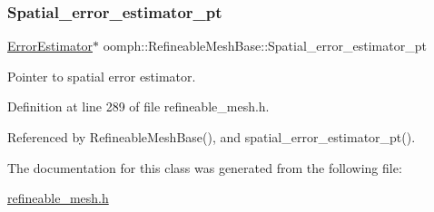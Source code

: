 \subsubsection{\texorpdfstring{Spatial\+\_\+error\+\_\+estimator\+\_\+pt}{Spatial\_error\_estimator\_pt}}
{\footnotesize\ttfamily \hyperlink{classoomph_1_1ErrorEstimator}{Error\+Estimator}$\ast$ oomph\+::\+Refineable\+Mesh\+Base\+::\+Spatial\+\_\+error\+\_\+estimator\+\_\+pt\hspace{0.3cm}{\ttfamily [protected]}}



Pointer to spatial error estimator. 



Definition at line 289 of file refineable\+\_\+mesh.\+h.



Referenced by Refineable\+Mesh\+Base(), and spatial\+\_\+error\+\_\+estimator\+\_\+pt().



The documentation for this class was generated from the following file\+:\begin{DoxyCompactItemize}
\item 
\hyperlink{refineable__mesh_8h}{refineable\+\_\+mesh.\+h}\end{DoxyCompactItemize}
